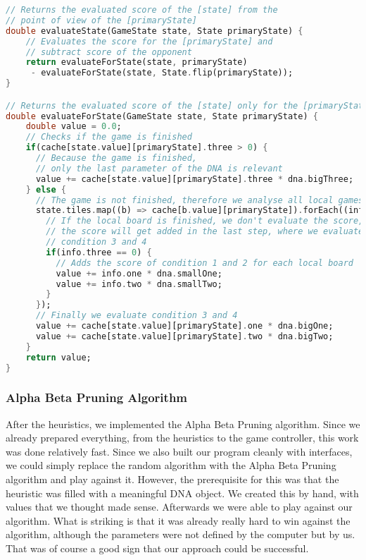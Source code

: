 \begin{lstlisting}[language=Dart,caption={Implementation of the heuristic}]
// Returns the evaluated score of the [state] from the
// point of view of the [primaryState]
double evaluateState(GameState state, State primaryState) {
	// Evaluates the score for the [primaryState] and
	// subtract score of the opponent
    return evaluateForState(state, primaryState)
     - evaluateForState(state, State.flip(primaryState));
}

// Returns the evaluated score of the [state] only for the [primaryState]
double evaluateForState(GameState state, State primaryState) {
    double value = 0.0;
    // Checks if the game is finished
    if(cache[state.value][primaryState].three > 0) {
      // Because the game is finished, 
      // only the last parameter of the DNA is relevant
      value += cache[state.value][primaryState].three * dna.bigThree;
    } else {
      // The game is not finished, therefore we analyse all local games
      state.tiles.map((b) => cache[b.value][primaryState]).forEach((info) {
        // If the local board is finished, we don't evaluate the score, because
        // the score will get added in the last step, where we evaluate
        // condition 3 and 4
        if(info.three == 0) {
       	  // Adds the score of condition 1 and 2 for each local board
          value += info.one * dna.smallOne;
          value += info.two * dna.smallTwo;
        }
      });
      // Finally we evaluate condition 3 and 4
      value += cache[state.value][primaryState].one * dna.bigOne;
      value += cache[state.value][primaryState].two * dna.bigTwo;
    }
    return value;
}
\end{lstlisting}

\subsubsection{Alpha Beta Pruning Algorithm}
After the heuristics, we implemented the Alpha Beta Pruning algorithm. Since we already prepared everything, from the heuristics to the game controller, this work was done relatively fast. Since we also built our program cleanly with interfaces, we could simply replace the random algorithm with the Alpha Beta Pruning algorithm and play against it. However, the prerequisite for this was that the heuristic was filled with a meaningful DNA object. We created this by hand, with values that we thought made sense. Afterwards we were able to play against our algorithm. What is striking is that it was already really hard to win against the algorithm, although the parameters were not defined by the computer but by us. That was of course a good sign that our approach could be successful.

